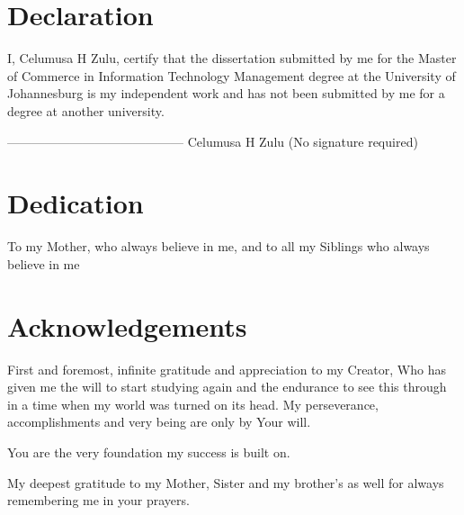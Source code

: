 \documentclass[11pt]{report}
\newcommand{\name}{Celumusa H Zulu}
\newcommand{\degree}{Master of Commerce}
\newcommand{\programme}{Information Technology Management}
\begin{document}
\chapter*{Declaration}
I, {\name}, certify that the dissertation submitted by me for the {\degree} in {\programme} degree at the University of Johannesburg is my independent work and has not been submitted by me for a degree at another university.

\vspace{2cm}
------------------------------------------ \newline
{\textsc \name} \newline
(No signature required)

\chapter*{Dedication}
\begin{center}
	To my Mother, \newline
	who always believe in me, \newline
	and to all my Siblings \newline
	who always believe in me \newline
	
\end{center}

\chapter*{Acknowledgements}
First and foremost, infinite gratitude and appreciation to my Creator, 
Who has given me the will to start studying again and the endurance to see this through in a time when my world was turned on its head. 
My perseverance, accomplishments and very being are only by Your will.

You are the very foundation my success is built on. 

My deepest gratitude to my Mother, Sister and my brother's as well for always remembering me in your prayers.
\end{document}
